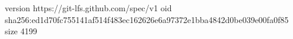 version https://git-lfs.github.com/spec/v1
oid sha256:ed1d70fc755141af514f483ec162626e6a97372e1bba4842d0be039e00fa0f85
size 4199
